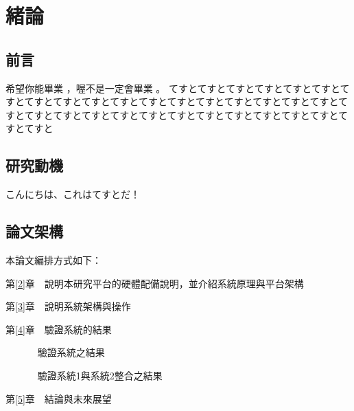 
\chapter{緒論}\label{1}


\section{前言}\label{1-1}
希望你能畢業 \cite{goossens97} ，喔不是一定會畢業 \cite{talbot97} 。
てすとてすとてすとてすとてすとてすとてすとてすとてすとてすとてすとてすとてすとてすとてすとてすとてすとてすとてすとてすとてすとてすとてすとてすとてすとてすとてすとてすとてすとてすとてすとてすと

\newpage

\section{研究動機}\label{1-2}
こんにちは、これはてすとだ！

\newpage

\section{論文架構}\label{1-3}

\n 本論文編排方式如下：

第\ref{2}章　說明本研究平台的硬體配備說明，並介紹系統原理與平台架構

第\ref{3}章　說明系統架構與操作

第\ref{4}章　驗證系統的結果
		
　　　      驗證系統之結果

　　　      驗證系統1與系統2整合之結果

第\ref{5}章　結論與未來展望
